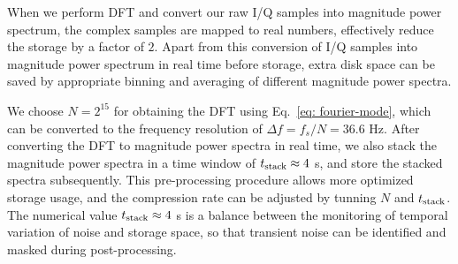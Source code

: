 \documentclass[12pt]{article}
\begin{document}
    When we perform DFT and convert our raw I/Q samples into magnitude power spectrum, the complex samples are mapped to real numbers, effectively reduce the storage by a factor of $2$.  
    Apart from this conversion of I/Q samples into magnitude power spectrum in real time before storage, extra disk space can be saved by appropriate binning and averaging of different magnitude power spectra.

    We choose $N = 2^{15}$ for obtaining the DFT using Eq.~\ref{eq: fourier-mode}, which can be converted to the frequency resolution of $\Delta f = f_s/N = 36.6$ Hz. 
    After converting the DFT to magnitude power spectra in real time, we also stack the magnitude power spectra in a time window of $t_{\rm stack} \approx 4$ s, and store the stacked spectra subsequently. 
    This pre-processing procedure allows more optimized storage usage, and the compression rate can be adjusted by tunning $N$ and $t_{\rm stack}$. 
    The numerical value $t_{\rm stack} \approx 4$ s is a balance between the monitoring of temporal variation of noise and storage space, so that transient noise can be identified and masked during post-processing.
    
\end{document}

